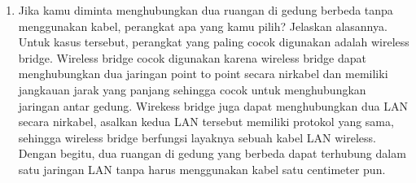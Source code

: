 \begin{enumerate}
	\item Jika kamu diminta menghubungkan dua ruangan di gedung berbeda tanpa menggunakan kabel, perangkat apa yang kamu pilih? Jelaskan alasannya.\\
	Untuk kasus tersebut, perangkat yang paling cocok digunakan adalah wireless bridge. Wireless bridge cocok digunakan karena wireless bridge dapat menghubungkan dua jaringan point to point secara nirkabel dan memiliki jangkauan jarak yang panjang sehingga cocok untuk menghubungkan jaringan antar gedung. Wirekess bridge juga dapat menghubungkan dua LAN secara nirkabel, asalkan kedua LAN tersebut memiliki protokol yang sama, sehingga wireless bridge berfungsi layaknya sebuah kabel LAN wireless. Dengan begitu, dua ruangan di gedung yang berbeda dapat terhubung dalam satu jaringan LAN tanpa harus menggunakan kabel satu centimeter pun.
\end{enumerate}